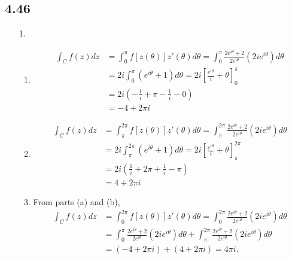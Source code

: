 \documentclass[a4paper,12pt]{article}
\begin{document}
\subsection*{4.46}
\begin{enumerate}
    \item[1.]
        \begin{enumerate}
            \item
                \begin{align*}
                    \int_C f(z) dz &= \int_0^\pi f[z(\theta)] z'(\theta) d\theta
                    = \int_0^\pi \frac{2e^{i\theta} + 2}{2e^{i\theta}} (2i e^{i\theta}) d\theta \\
                    &= 2i \int_0^\pi (e^{i\theta} + 1) d\theta
                    = 2i \left[ \frac{e^{i\theta}}{i} + \theta \right]_0^\pi \\
                    &= 2i \left( -\frac{1}{i} + \pi - \frac{1}{i} - 0 \right) \\
                    &= -4 + 2\pi i
                \end{align*}

            \item
                \begin{align*}
                    \int_C f(z) dz &= \int_\pi^{2\pi} f[z(\theta)] z'(\theta) d\theta
                    = \int_\pi^{2\pi} \frac{2e^{i\theta} + 2}{2e^{i\theta}} (2i e^{i\theta}) d\theta \\
                    &= 2i \int_\pi^{2\pi} (e^{i\theta} + 1) d\theta
                    = 2i \left[ \frac{e^{i\theta}}{i} + \theta \right]_\pi^{2\pi} \\
                    &= 2i \left( \frac{1}{i} + 2\pi + \frac{1}{i} - \pi \right) \\
                    &= 4 + 2\pi i
                \end{align*}

            \item
                From parts (a) and (b),
                \begin{align*}
                    \int_C f(z) dz &= \int_0^{2\pi} f[z(\theta)] z'(\theta) d\theta
                    = \int_0^{2\pi} \frac{2e^{i\theta} + 2}{2e^{i\theta}} (2i e^{i\theta}) d\theta \\
                    &= \int_0^{\pi} \frac{2e^{i\theta} + 2}{2e^{i\theta}} (2i e^{i\theta}) d\theta + \int_\pi^{2\pi} \frac{2e^{i\theta} + 2}{2e^{i\theta}} (2i e^{i\theta}) d\theta \\
                    &= (-4 + 2\pi i) + (4 + 2\pi i) = 4\pi i.
                \end{align*}
        \end{enumerate}


\end{enumerate}
\end{document}
